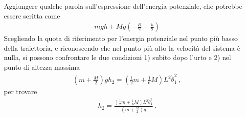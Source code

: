 \documentclass[letterpaper,10pt,italian]{jupyterBook}
\begin{document}
\sphinxAtStartPar
{} Aggiungere qualche parola sull’espressione dell’energia potenziale, che potrebbe essere scritta come
\begin{equation*}
\begin{split}m g h + M g \left(-\frac{R}{2} + \frac{h}{2} \right)\end{split}
\end{equation*}
\sphinxAtStartPar
Scegliendo la quota di riferimento per l’energia potenziale nel punto più basso della traiettoria, e riconoscendo che nel punto più alto la velocità del sistema è nulla, si possono confrontare le due condizioni 1) subito dopo l’urto e 2) nel punto di altezza massima
\begin{equation*}
\begin{split}\left( m + \frac{M}{2} \right) g h_2 = \left( \frac{1}{2} m + \frac{1}{6} M \right) L^2 \dot{\theta}_1^2 \ ,\end{split}
\end{equation*}
\sphinxAtStartPar
per trovare
\begin{equation*}
\begin{split}h_2 = \frac{\left(\frac{1}{2} m + \frac{1}{6} M \right) L^2 \dot{\theta}_1^2 }{\left( m + \frac{M}{2} \right) g} \ .\end{split}
\end{equation*}
\end{document}
